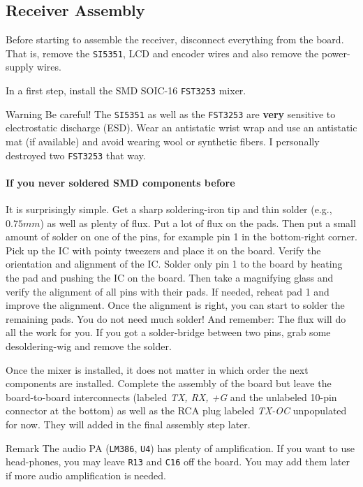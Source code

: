 \documentclass[10pt, a4paper,twoside]{scrartcl}
\newenvironment{remark}{\begin{bclogo}[couleur=blue!30,arrondi=.1,logo=\bcinfo,ombre=true]{Remark}}{\end{bclogo}}
\newenvironment{warning}{\begin{bclogo}[couleur=red!30,arrondi=.1,logo=\bcattention,ombre=true]{Warning}}{\end{bclogo}}
\begin{document}
\subsection{Receiver Assembly}
Before starting to assemble the receiver, disconnect everything from the board. That is, remove the \texttt{SI5351}, LCD and encoder wires and also remove the power-supply wires.

In a first step, install the SMD SOIC-16 \texttt{FST3253} mixer. 

\begin{warning}
 Be careful! The \texttt{SI5351} as well as the \texttt{FST3253} are \textbf{very} sensitive to electrostatic discharge (ESD). Wear an antistatic wrist wrap and use an antistatic mat (if available) and avoid wearing wool or synthetic fibers. I personally destroyed two \texttt{FST3253} that way. 
\end{warning}

\paragraph{If you never soldered SMD components before} It is surprisingly simple. Get a sharp soldering-iron tip and thin solder (e.g., $0.75mm$) as well as plenty of flux. Put a lot of flux on the pads. Then put a small amount of solder on one of the pins, for example pin 1 in the bottom-right corner. Pick up the IC with pointy tweezers and place it on the board. Verify the orientation and alignment of the IC. Solder only pin 1 to the board by heating the pad and pushing the IC on the board. Then take a magnifying glass and verify the alignment of all pins with their pads. If needed, reheat pad 1 and improve the alignment. Once the alignment is right, you can start to solder the remaining pads. You do not need much solder! And remember: The flux will do all the work for you. If you got a solder-bridge between two pins, grab some desoldering-wig and remove the solder. 

Once the mixer is installed, it does not matter in which order the next components are installed. Complete the assembly of the board but leave the board-to-board interconnects (labeled \emph{TX, RX, +G} and the unlabeled 10-pin connector at the bottom) as well as the RCA plug labeled \emph{TX-OC } unpopulated for now. They will added in the final assembly step later.

\begin{remark}
The audio PA (\texttt{LM386}, \texttt{U4}) has plenty of amplification. If you want to use head-phones, you may leave \texttt{R13} and \texttt{C16} off the board. You may add them later if more audio amplification is needed.
\end{remark}
\end{document}
